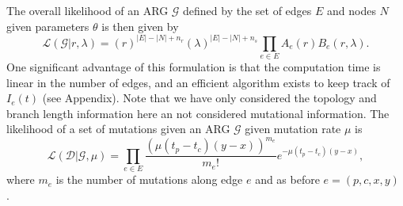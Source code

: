 \documentclass{article}
\newcommand{\comment}[1]{{\it \color{orange} (#1)}}
\begin{document}
The overall likelihood of an ARG $\mathcal{G}$ defined by the set of edges $E$ and nodes $N$
given parameters $\theta$ is then given by
\begin{equation}\label{eq:full-lik}
    \mathcal{L}(\mathcal{G}|r, \lambda)
    =
    (r)^{|E|-|N|+n_r} (\lambda)^{|E|-|N|+n_s} \prod_{e \in E} A_e(r) B_e(r, \lambda) .
\end{equation}
One significant advantage of this formulation is that the computation time
is linear in the number of edges, and an efficient algorithm exists
to keep track of $I_e(t)$ (see Appendix).
Note that we have only considered the topology and branch length information here
an not considered mutational information.
The likelihood of a set of mutations given an ARG $\mathcal{G}$ given mutation rate $\mu$ is
\begin{equation}\label{eq:lik-mut}
    \mathcal{L}(\mathcal{D}|\mathcal{G}, \mu)
    =
    \prod_{e \in E} \frac{(\mu(t_p-t_c)(y-x))^{m_e}}{m_e!} e^{-\mu (t_p-t_c)(y-x)} ,
\end{equation}
where 
$m_e$ is the number of mutations along edge $e$ 
and as before $e = (p,c,x,y)$
\citep{mahmoudi_bayesian_2022}.
\end{document}
